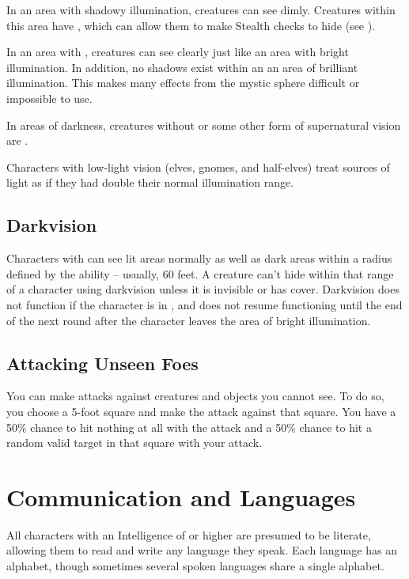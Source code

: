     In an area with shadowy illumination, creatures can see dimly.
    Creatures within this area have \concealment, which can allow them to make Stealth checks to hide (see ).

    In an area with , creatures can see clearly just like an area with bright illumination.
    In addition, no shadows exist within an an area of brilliant illumination.
    This makes many effects from the  mystic sphere difficult or impossible to use.

    In areas of darkness, creatures without  or some other form of supernatural vision are \blinded.

    Characters with low-light vision (elves, gnomes, and half-elves) treat sources of light as if they had double their normal illumination range.

    \subsection{Darkvision}\label{Darkvision}
        Characters with  can see lit areas normally as well as dark areas within a radius defined by the ability -- usually, 60 feet.
        A creature can't hide within that range of a character using darkvision unless it is invisible or has cover.
        Darkvision does not function if the character is in , and does not resume functioning until the end of the next round after the character leaves the area of bright illumination.

    \subsection{Attacking Unseen Foes}
        You can make attacks against creatures and objects you cannot see.
        To do so, you choose a 5-foot square and make the attack against that square.
        You have a 50\% chance to hit nothing at all with the attack and a 50\% chance to hit a random valid target in that square with your attack.

\section{Communication and Languages}\label{Languages}

    All characters with an Intelligence of  or higher are presumed to be literate, allowing them to read and write any language they speak. Each language has an alphabet, though sometimes several spoken languages share a single alphabet.


